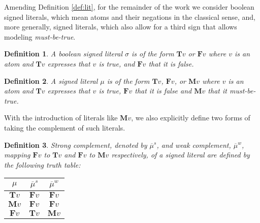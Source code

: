 \documentclass{vutinfth} %
\newtheorem{definition}{Definition}[chapter]
\newcommand{\mbt}{must-be-true\xspace}
\newcommand{\negstrong}[1]{\overline{#1}^s}
\newcommand{\negweak}[1]{\overline{#1}^w}
\newcommand{\bT}{\mathbf{T}}
\newcommand{\bM}{\mathbf{M}}
\newcommand{\bF}{\mathbf{F}}
\newcommand{\sgl}{\mu}
\newcommand{\bsgl}{\sigma}
\newcommand{\wkn}{\textit{weaken}}
\begin{document}
Amending Definition \ref{def:lit}, for the remainder of the work we consider boolean signed literals, which mean atoms and their negations in the classical sense, and, more generally, signed literals, which also allow for a third sign that allows modeling \emph{\mbt}.

\begin{definition}
A \emph{boolean signed literal} $\bsgl$ is of the form $\bT v$ or $\bF v$ where $v$ is an atom and $\bT v$ expresses that $v$ is \emph{true}, and $\bF v$ that it is \emph{false}.
\end{definition}

\begin{definition}
A \emph{signed literal} $\sgl$ is of the form $\bT v$, $\bF v$, or $\bM v$ where $v$ is an atom and $\bT v$ expresses that $v$ is \emph{true}, $\bF v$ that it is \emph{false} and $\bM v$ that it \emph{\mbt}.
\end{definition}



With the introduction of literals like $\bM v$, we also explicitly define two forms of taking the complement of such literals.

\begin{definition}
Strong complement, denoted by $\negstrong{\sgl}$, and weak complement, $\negweak{\sgl}$, mapping $\bF v$ to $\bT v$ and $\bF v$ to $\bM v$ respectively, of a signed literal are defined by the following truth table:%

\begin{center}
\begin{tabular}{|c|cc|}
\hline
$\sgl$&$\negstrong{\sgl}$&$\negweak{\sgl}$\\
\hline
\hline
$\bT v$&$\bF v$&$\bF v$\\
$\bM v$&$\bF v$&$\bF v$\\
$\bF v$&$\bT v$&$\bM v$\\
\hline
\end{tabular}
\end{center}
\end{definition}
\end{document}
